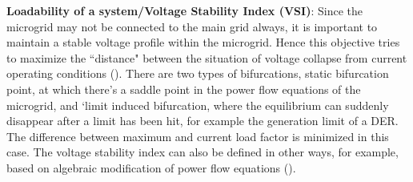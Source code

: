 \textbf{Loadability of a system/Voltage Stability Index (VSI)}: Since the microgrid may not be connected to the main grid always, it is important to maintain a stable voltage profile within the microgrid. Hence this objective tries to maximize the ``distance" between the situation of voltage collapse from current operating conditions (\citep{mgrj04}). There are two types of bifurcations, static bifurcation point, at which there's a saddle point in the power flow equations of the microgrid, and `limit induced bifurcation, where the equilibrium can suddenly disappear after a limit has been hit, for example the generation limit of a DER. The difference between maximum and current load factor is minimized in this case. The voltage stability index can also be defined in other ways, for example, based on algebraic modification of power flow equations (\citep{mgrj14}).

